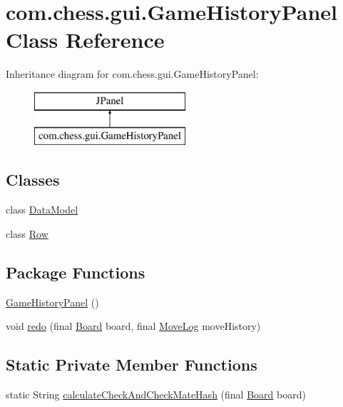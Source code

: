 \hypertarget{classcom_1_1chess_1_1gui_1_1_game_history_panel}{}\section{com.\+chess.\+gui.\+Game\+History\+Panel Class Reference}
\label{classcom_1_1chess_1_1gui_1_1_game_history_panel}
Inheritance diagram for com.\+chess.\+gui.\+Game\+History\+Panel\+:\begin{figure}[H]
\begin{center}
\leavevmode
\includegraphics[height=2.000000cm]{classcom_1_1chess_1_1gui_1_1_game_history_panel}
\end{center}
\end{figure}
\subsection*{Classes}
\begin{DoxyCompactItemize}
\item 
class \mbox{\hyperlink{classcom_1_1chess_1_1gui_1_1_game_history_panel_1_1_data_model}{Data\+Model}}
\item 
class \mbox{\hyperlink{classcom_1_1chess_1_1gui_1_1_game_history_panel_1_1_row}{Row}}
\end{DoxyCompactItemize}
\subsection*{Package Functions}
\begin{DoxyCompactItemize}
\item 
\mbox{\hyperlink{classcom_1_1chess_1_1gui_1_1_game_history_panel_a8baa19efea3a60e128a429380d73f852}{Game\+History\+Panel}} ()
\item 
void \mbox{\hyperlink{classcom_1_1chess_1_1gui_1_1_game_history_panel_a378b38f2216765cf13f05faa2a208631}{redo}} (final \mbox{\hyperlink{classcom_1_1chess_1_1engine_1_1classic_1_1board_1_1_board}{Board}} board, final \mbox{\hyperlink{classcom_1_1chess_1_1gui_1_1_table_1_1_move_log}{Move\+Log}} move\+History)
\end{DoxyCompactItemize}
\subsection*{Static Private Member Functions}
\begin{DoxyCompactItemize}
\item 
static String \mbox{\hyperlink{classcom_1_1chess_1_1gui_1_1_game_history_panel_a85ee21afff46e7612d25a4e388b8e98a}{calculate\+Check\+And\+Check\+Mate\+Hash}} (final \mbox{\hyperlink{classcom_1_1chess_1_1engine_1_1classic_1_1board_1_1_board}{Board}} board)
\end{DoxyCompactItemize}
